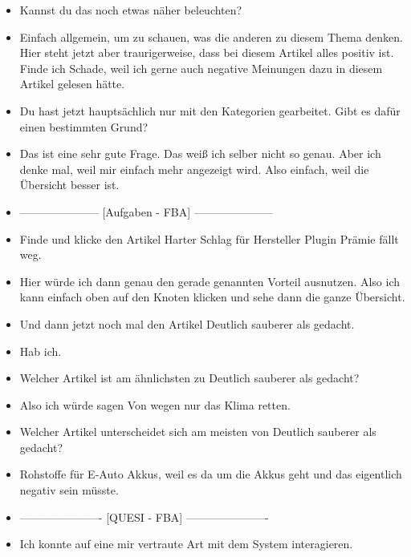 {\begin{itemize}[]
                  Das klingt eigentlich ganz interessant.
            \item {} Kannst du das noch etwas näher beleuchten?
            \item {} Einfach allgemein, um zu schauen, was die anderen zu diesem Thema denken.
                  Hier steht jetzt aber traurigerweise, dass bei diesem Artikel alles positiv ist.
                  Finde ich Schade, weil ich gerne auch negative Meinungen dazu in diesem Artikel gelesen hätte.
            \item {} Du hast jetzt hauptsächlich nur mit den Kategorien gearbeitet.
                  Gibt es dafür einen bestimmten Grund?
            \item {} Das ist eine sehr gute Frage.
                  Das weiß ich selber nicht so genau.
                  Aber ich denke mal, weil mir einfach mehr angezeigt wird.
                  Also einfach, weil die Übersicht besser ist.
            \item {---------------------} [Aufgaben - FBA] {---------------------}
            \item {} Finde und klicke den Artikel \flqq Harter Schlag für Hersteller Plugin Prämie fällt weg\frqq{}.
            \item {} Hier würde ich dann genau den gerade genannten Vorteil ausnutzen.
                  Also ich kann einfach oben auf den Knoten klicken und sehe dann die ganze Übersicht.
            \item {} Und dann jetzt noch mal den Artikel \flqq Deutlich sauberer als gedacht\frqq{}.
            \item {} Hab ich.
            \item {} Welcher Artikel ist am ähnlichsten zu \flqq Deutlich sauberer als gedacht\frqq{}?
            \item {} Also ich würde sagen \flqq Von wegen nur das Klima retten\frqq{}.
            \item {} Welcher Artikel unterscheidet sich am meisten von \flqq Deutlich sauberer als gedacht\frqq{}?
            \item {} \flqq Rohstoffe für E-Auto Akkus\frqq{}, weil es da um die Akkus geht und das eigentlich negativ sein müsste.
            \item {----------------------} [QUESI - FBA] {----------------------}
            \item {} Ich konnte auf eine mir vertraute Art mit dem System interagieren.

\end{itemize}}
